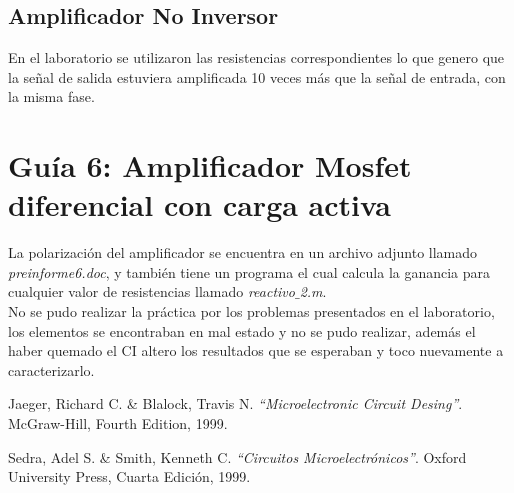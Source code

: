 \documentclass[11pt,graphicx,caption,rotating]{article}
\begin{document}
\subsection{Amplificador No Inversor}
\noindent
En el laboratorio se utilizaron las resistencias correspondientes lo que genero que la señal de salida estuviera amplificada 10 veces más que la señal de entrada, con la misma fase.

\section{Guía 6: Amplificador Mosfet diferencial con carga activa}
\noindent
La polarización del amplificador se encuentra en un archivo adjunto llamado \textit{preinforme6.doc}, y también tiene un programa el cual calcula la ganancia para cualquier valor de resistencias llamado \textit{reactivo$\_$2.m}.\\
No se pudo realizar la práctica por los problemas presentados en el laboratorio, los elementos se encontraban en mal estado y no se pudo realizar, además el haber quemado el CI altero los resultados que se esperaban y toco nuevamente a caracterizarlo.


\begin{thebibliography}{99}
 Jaeger, Richard C. \& Blalock, Travis N.
{\em "`Microelectronic Circuit Desing"'}.
McGraw-Hill, Fourth Edition, 1999.

 Sedra, Adel S. \& Smith, Kenneth C.
{\em "`Circuitos Microelectrónicos"'}.
Oxford University Press, Cuarta Edición, 1999.
\end{thebibliography}
\end{document}
